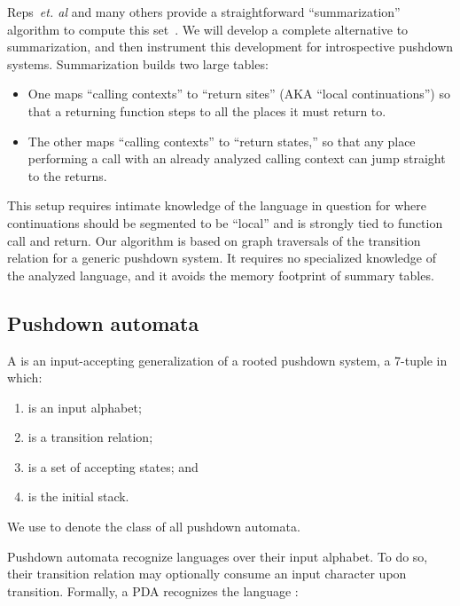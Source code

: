 Reps~\emph{et. al} and many others provide a straightforward ``summarization'' algorithm
to compute this set~\cite{mattmight:Bouajjani:1997:PDA-Reachability,dvanhorn:Kodumal2004Set,mattmight:Reps:1998:CFL,mattmight:Reps:2005:Weighted-PDA}.
We will develop a complete alternative to summarization, and then instrument this development for introspective pushdown systems.
Summarization builds two large tables: 
\begin{itemize}
\item{One maps ``calling contexts'' to ``return sites'' (AKA ``local
  continuations'') so that a returning function steps to all the
  places it must return to.}
\item{The other maps ``calling contexts'' to
  ``return states,'' so that any place performing a call with an
  already analyzed calling context can jump straight to the returns.}
\end{itemize}
This setup requires intimate knowledge of the language in question for where continuations should be segmented to be ``local'' and is strongly tied to function call and return.
Our algorithm is based on graph traversals of the transition relation for a generic pushdown system.
It requires no specialized knowledge of the analyzed language, and it avoids the memory footprint of summary tables.


\subsection{Pushdown automata}
A  is an input-accepting generalization
of a rooted pushdown system, a 7-tuple
 in which:
\begin{enumerate}
\item  is an input alphabet; 

\item  is a
  transition relation; 

\item  is a set of accepting states; and

\item  is the initial stack.

\end{enumerate}
We use  to denote the class of all pushdown automata.

Pushdown automata recognize languages over their input alphabet.
To do so, their transition relation may optionally consume an input
character upon transition.
Formally, a PDA 
recognizes the language :

